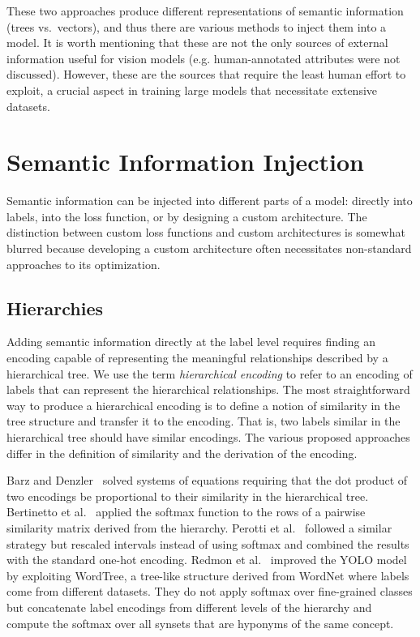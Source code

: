 These two approaches produce different representations of semantic information (trees vs.\ vectors), and thus there are various methods to inject them into a model.
It is worth mentioning that these are not the only sources of external information useful for vision models (e.g. human-annotated attributes were not discussed). However, these are the sources that require the least human effort to exploit, a crucial aspect in training large models that necessitate extensive datasets.

\section{Semantic Information Injection}
\label{sec:semantic-information-injection}

Semantic information can be injected into different parts of a model: directly into labels, into the loss function, or by designing a custom architecture. The distinction between custom loss functions and custom architectures is somewhat blurred because developing a custom architecture often necessitates non-standard approaches to its optimization.

\subsection{Hierarchies}
\label{subsec:hierarchies}

Adding semantic information directly at the label level requires finding an encoding capable of representing the meaningful relationships described by a hierarchical tree. We use the term \emph{hierarchical encoding} to refer to an encoding of labels that can represent the hierarchical relationships. The most straightforward way to produce a hierarchical encoding is to define a notion of similarity in the tree structure and transfer it to the encoding. That is, two labels similar in the hierarchical tree should have similar encodings. The various proposed approaches differ in the definition of similarity and the derivation of the encoding. 

Barz and Denzler~\cite{HierarchyBasedBarz2018} solved systems of equations requiring that the dot product of two encodings be proportional to their similarity in the hierarchical tree.
Bertinetto et al.~\cite{MakingBetterMBertin2019} applied the softmax function to the rows of a pairwise similarity matrix derived from the hierarchy.
Perotti et al.~\cite{BeyondOneHotPerott2023} followed a similar strategy but rescaled intervals instead of using softmax and combined the results with the standard one-hot encoding.
Redmon et al.~\cite{Yolo9000BetteRedmon2016} improved the YOLO model~\cite{YouOnlyLookORedmon2015} by exploiting WordTree, a tree-like structure derived from WordNet where labels come from different datasets. They do not apply softmax over fine-grained classes but concatenate label encodings from different levels of the hierarchy and compute the softmax over all synsets that are hyponyms of the same concept.

